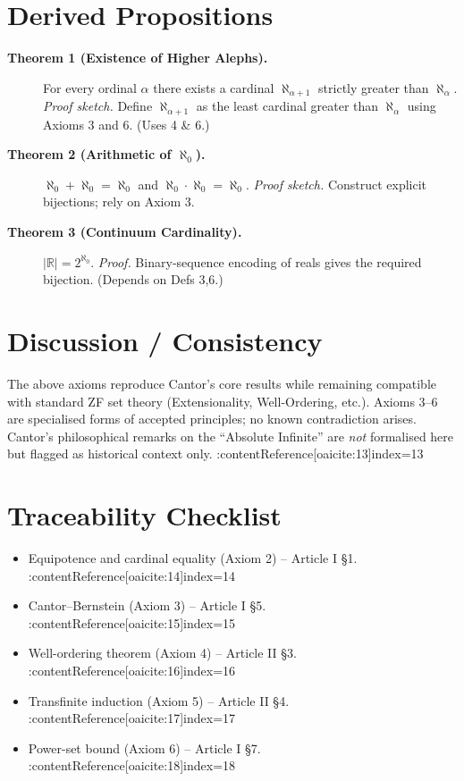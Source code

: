 \documentclass[11pt]{article}
\begin{document}
\section*{Derived Propositions}
\begin{description}

\item[\textbf{Theorem 1 (Existence of Higher Alephs).}]
For every ordinal $\alpha$ there exists a cardinal
$\aleph_{\alpha+1}$ strictly greater than $\aleph_\alpha$.
\emph{Proof sketch.} Define $\aleph_{\alpha+1}$ as the least cardinal
greater than $\aleph_\alpha$ using Axioms 3 and 6.  (Uses 4 & 6.) 

\item[\textbf{Theorem 2 (Arithmetic of $\aleph_0$).}]
$\aleph_0+\aleph_0=\aleph_0$ and $\aleph_0\cdot\aleph_0=\aleph_0$.
\emph{Proof sketch.} Construct explicit bijections; rely on
Axiom 3. 

\item[\textbf{Theorem 3 (Continuum Cardinality).}]
$\lvert\mathbb R\rvert=2^{\aleph_0}$.
\emph{Proof.} Binary‐sequence encoding of reals gives the required
bijection.  (Depends on Defs 3,6.) 

\end{description}

\section*{Discussion / Consistency}
The above axioms reproduce Cantor’s core results while remaining
compatible with standard ZF set theory (Extensionality, Well-Ordering,
etc.). Axioms 3–6 are specialised forms of accepted principles; no
known contradiction arises.  Cantor’s philosophical remarks on the
“Absolute Infinite” are \emph{not} formalised here but flagged as
historical context only. :contentReference[oaicite:13]{index=13}

\section*{Traceability Checklist}
\begin{itemize}
  \item Equipotence and cardinal equality (Axiom 2) – Article I §1. :contentReference[oaicite:14]{index=14}
  \item Cantor–Bernstein (Axiom 3) – Article I §5. :contentReference[oaicite:15]{index=15}
  \item Well-ordering theorem (Axiom 4) – Article II §3. :contentReference[oaicite:16]{index=16}
  \item Transfinite induction (Axiom 5) – Article II §4. :contentReference[oaicite:17]{index=17}
  \item Power-set bound (Axiom 6) – Article I §7. :contentReference[oaicite:18]{index=18}
\end{itemize}
\end{document}
